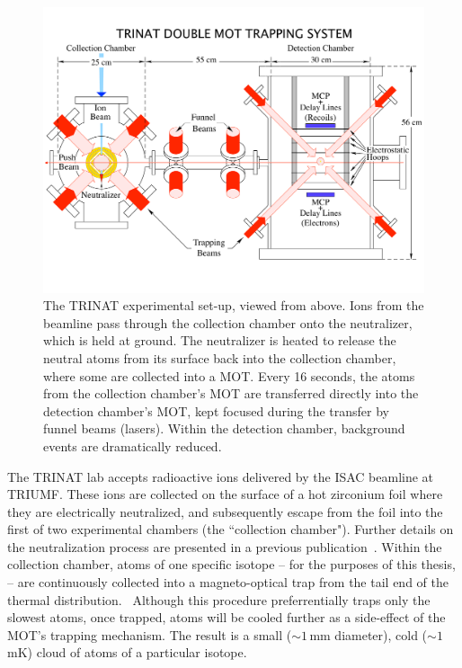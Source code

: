 \begin{figure}[t!h]
	\centering
	\includegraphics[width=.999\linewidth]
	{Figures/DoubleMot5.pdf}
	\caption[The TRINAT experimental set-up, viewed from above]{The TRINAT experimental set-up, viewed from above.  Ions from the beamline pass through the collection chamber onto the neutralizer, which is held at ground.  The neutralizer is heated to release the neutral atoms from its surface back into the collection chamber, where some are collected into a \ac{MOT}.  Every 16 seconds, the atoms from the collection chamber's MOT are transferred directly into the detection chamber's MOT, kept focused during the transfer by funnel beams (lasers).  Within the detection chamber, background events are dramatically reduced.  }
	\label{fig:doublemot}
\end{figure}

The TRINAT lab accepts radioactive ions delivered by the ISAC beamline at TRIUMF.  These ions are collected on the surface of a hot zirconium foil where they are electrically neutralized, and subsequently escape from the foil into the first of two experimental chambers (the ``collection chamber").  Further details on the neutralization process are presented in a previous publication~\cite{gorelov2000}.  Within the collection chamber, atoms of one specific isotope -- for the purposes of this thesis,   -- are continuously collected into a magneto-optical trap from the tail end of the thermal distribution.~  Although this procedure preferrentially traps only the slowest atoms, once trapped, atoms will be cooled further as a side-effect of the MOT's trapping mechanism.  The result is a small ($\sim\!1\,$mm diameter), cold ($\sim\!1\,$mK) cloud of atoms of a particular isotope.  

